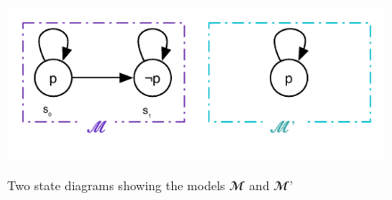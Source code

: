 \documentclass[a4paper, 12pt]{article}
\begin{document}
\begin{figure}[htbp]
    \caption{Two state diagrams showing the models $𝓜$ and $𝓜’$}
    \vskip 0.2cm
    \centering
    \includegraphics[width=1\textwidth]{Figures/State Diagram AGEFp}
    \label{figure:State_Diagram_AGEFp}
\end{figure}



\end{document}
